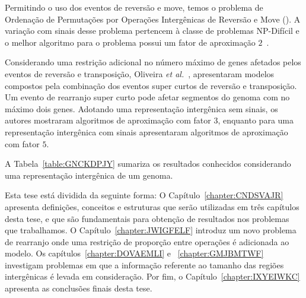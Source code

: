 Permitindo o uso dos eventos de reversão e move, temos o problema de Ordenação de Permutações por Operações Intergênicas de Reversão e Move (\SbIRM). A variação com sinais desse problema pertencem à classe de problemas NP-Difícil e o melhor algoritmo para o problema possui um fator de aproximação $2$~\cite{2022b-brito-etal}.

Considerando uma restrição adicional no número máximo de genes afetados pelos eventos de reversão e transposição, Oliveira \textit{et al.}~\cite{2019c-oliveira-etal}, apresentaram modelos compostos pela combinação dos eventos super curtos de reversão e transposição. Um evento de rearranjo super curto pode afetar segmentos do genoma com no máximo dois genes. Adotando uma representação intergênica sem sinais, os autores mostraram algoritmos de aproximação com fator $3$, enquanto para uma representação intergênica com sinais apresentaram algoritmos de aproximação com fator $5$.

A Tabela~\ref{table:GNCKDPJY} sumariza os resultados conhecidos considerando uma representação intergênica de um genoma.



Esta tese está dividida da seguinte forma: O Capítulo~\ref{chapter:CNDSVAJR} apresenta definições, conceitos e estruturas que serão utilizadas em três capítulos desta tese, e que são fundamentais para obtenção de resultados nos problemas que trabalhamos. O Capítulo~\ref{chapter:JWIGFELF} introduz um novo problema de rearranjo onde uma restrição de proporção entre operações é adicionada ao modelo. Os capítulos~\ref{chapter:DOVAEMLI} e ~\ref{chapter:GMJBMTWF} investigam problemas em que a informação referente ao tamanho das regiões intergênicas é levada em consideração. Por fim, o Capítulo~\ref{chapter:IXYEIWKC} apresenta as conclusões finais desta tese. 


